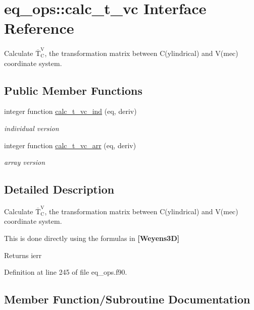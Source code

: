 \hypertarget{interfaceeq__ops_1_1calc__t__vc}{}\section{eq\+\_\+ops\+:\+:calc\+\_\+t\+\_\+vc Interface Reference}
\label{interfaceeq__ops_1_1calc__t__vc}


Calculate $\overline{\text{T}}_\text{C}^\text{V}$, the transformation matrix between C(ylindrical) and V(mec) coordinate system.  


\subsection*{Public Member Functions}
\begin{DoxyCompactItemize}
\item 
integer function \hyperlink{interfaceeq__ops_1_1calc__t__vc_a76001b9e5f1811edd02b4cca49774897}{calc\+\_\+t\+\_\+vc\+\_\+ind} (eq, deriv)
\begin{DoxyCompactList}\small\item\em individual version \end{DoxyCompactList}\item 
integer function \hyperlink{interfaceeq__ops_1_1calc__t__vc_a2670ea34e0bbfc9aeeb7c0422075ea8b}{calc\+\_\+t\+\_\+vc\+\_\+arr} (eq, deriv)
\begin{DoxyCompactList}\small\item\em array version \end{DoxyCompactList}\end{DoxyCompactItemize}


\subsection{Detailed Description}
Calculate $\overline{\text{T}}_\text{C}^\text{V}$, the transformation matrix between C(ylindrical) and V(mec) coordinate system. 

This is done directly using the formula\textquotesingle{}s in {\bfseries [Weyens3D]}

\begin{DoxyReturn}{Returns}
ierr 
\end{DoxyReturn}


Definition at line 245 of file eq\+\_\+ops.\+f90.



\subsection{Member Function/\+Subroutine Documentation}
\mbox{\label{interfaceeq__ops_1_1calc__t__vc_a2670ea34e0bbfc9aeeb7c0422075ea8b}} 
